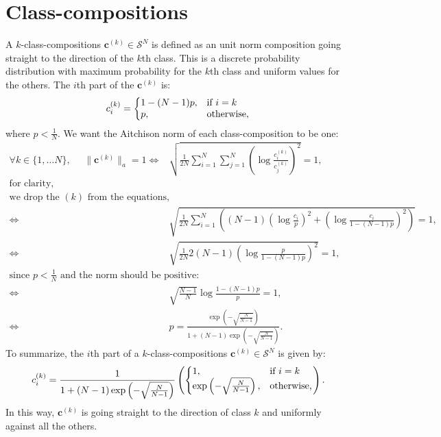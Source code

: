 \documentclass{article}
\theoremstyle{plain}
\theoremstyle{definition}
\theoremstyle{remark}
\begin{document}
\newpage
\section{Class-compositions}
\label{app:classcompo}
A $k$-class-compositions $\bm{c}^{(k)}  \in \mathcal{S}^N$ is defined as an unit norm composition going straight to the direction of the $k$th class. This is a discrete probability distribution with maximum probability for the $k$th class and uniform values for the others. The $i$th part of the $\bm{c}^{(k)}$ is:
\begin{equation}
    c_i^{(k)} = \left\lbrace
  \begin{array}{@{}ll@{}}
    1-(N-1)p, & \text{if}\ i=k \\
    p, & \text{otherwise,}
  \end{array}\right.
\end{equation}
where $p<\frac{1}{N}$. We want the Aitchison norm of each class-composition to be one:
\begin{equation}
  \begin{aligned}
    \forall k \in \{1, \dots N \},~~~~~~\lVert \bm{c}^{(k)} \rVert_a = 1 \iff& \sqrt{\frac{1}{2N} \sum_{i=1}^N \sum_{j=1}^N \left( \log \frac{c_i^{(k)}}{c_j^{(k)}} \right)^2} = 1,\\
    \text{for clarity,}&\\\text{we drop the $(k)$ from the equations,}&\\
    \iff& \sqrt{\frac{1}{2N} \sum_{i=1}^{N}\left( \left(N-1 \right) \left( \log \frac{c_i}{p} \right)^2 + \left( \log \frac{c_i}{1-(N-1)p} \right)^2 \right)} = 1,\\
    \iff& \sqrt{\frac{1}{2N} 2(N-1) \left( \log \frac{p}{1-(N-1)p} \right)^2} =1,\\
    \text{since $p<\frac{1}{N}$ and the norm should be positive:}&\\
    \iff& \sqrt{\frac{N-1}{N}}\log \frac{1-(N-1)p}{p} =1,\\
    \iff& p = \frac{\exp \left( -\sqrt{\frac{N}{N-1}} \right)}{1+ (N-1)\exp \left( -\sqrt{\frac{N}{N-1}} \right )}.
  \end{aligned}
\end{equation}
To summarize, the $i$th part of a $k$-class-compositions $\bm{c}^{(k)} \in \mathcal{S}^N$ is given by:
\begin{equation}
    c_i^{(k)} =
  \frac{1}{1+ (N-1)\exp \left( -\sqrt{\frac{N}{N-1}} \right )} \left( \left\lbrace \begin{array}{@{}ll@{}}
     1, & \text{if}\ i=k \\
     \exp \left( -\sqrt{\frac{N}{N-1}} \right), & \text{otherwise,}
  \end{array}\right.\right).
\end{equation}
In this way, $\bm{c}^{(k)}$ is going straight to the direction of class $k$ and uniformly against all the others.
\end{document}
